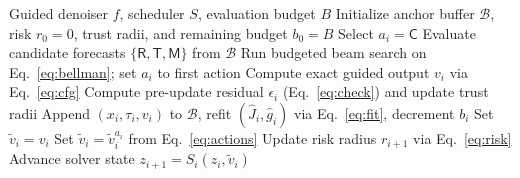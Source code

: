 \begin{algorithm}[t]
\caption{\method\ Receding-Horizon Cache Control}
\label{alg:mpcache}
\begin{algorithmic}[1]
\REQUIRE Guided denoiser $f$, scheduler $S$, evaluation budget $B$
\STATE Initialize anchor buffer $\mathcal B$, risk $r_0=0$, trust radii, and remaining budget $b_0=B$
\STATE Select $a_i=\mathsf C$
\ELSE
\STATE Evaluate candidate forecasts $\{\mathsf R,\mathsf T,\mathsf M\}$ from $\mathcal B$
\STATE Run budgeted beam search on Eq.~\eqref{eq:bellman}; set $a_i$ to first action
\ENDIF
{}
\STATE Compute exact guided output $v_i$ via Eq.~\eqref{eq:cfg}
\STATE Compute pre-update residual $\epsilon_i$ (Eq.~\eqref{eq:check}) and update trust radii
\STATE Append $(x_i,\tau_i,v_i)$ to $\mathcal B$, refit $(\widehat J_i,\widehat g_i)$ via Eq.~\eqref{eq:fit}, decrement $b_i$
\STATE Set $\widetilde v_i=v_i$
\ELSE
\STATE Set $\widetilde v_i=\widetilde v_i^{a_i}$ from Eq.~\eqref{eq:actions}
\ENDIF
\STATE Update risk radius $r_{i+1}$ via Eq.~\eqref{eq:risk}
\STATE Advance solver state $z_{i+1}=S_i(z_i,\widetilde v_i)$
\ENDFOR
\end{algorithmic}
\end{algorithm}
